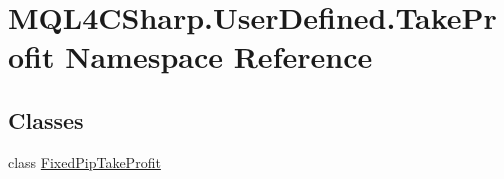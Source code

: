 \hypertarget{namespace_m_q_l4_c_sharp_1_1_user_defined_1_1_take_profit}{}\section{M\+Q\+L4\+C\+Sharp.\+User\+Defined.\+Take\+Profit Namespace Reference}
\label{namespace_m_q_l4_c_sharp_1_1_user_defined_1_1_take_profit}
\subsection*{Classes}
\begin{DoxyCompactItemize}
\item 
class \hyperlink{class_m_q_l4_c_sharp_1_1_user_defined_1_1_take_profit_1_1_fixed_pip_take_profit}{Fixed\+Pip\+Take\+Profit}
\end{DoxyCompactItemize}
